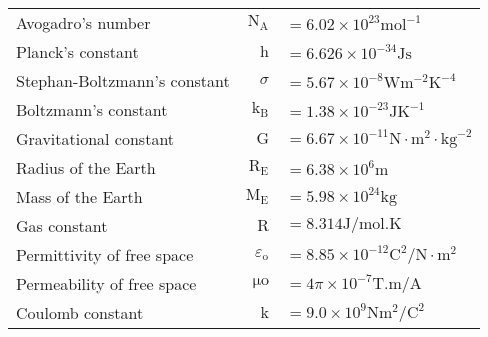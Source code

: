 \documentclass{extarticle}
\begin{document}
\markStart[50]
\begin{tabularx}{\textwidth}{@{}X@{}r@{}l@{}}
Avogadro's number & $\mathrm{N}_{\mathrm{A}}$ & $=6.02 \times 10^{23} \mathrm{mol}^{-1}$ \\
Planck's constant & $\mathrm{h}$ & $=6.626 \times 10^{-34} \mathrm{J} \mathrm{s}$ \\
Stephan-Boltzmann's constant & $\sigma$ & $=5.67 \times 10^{-8} \mathrm{W} \mathrm{m}^{-2} \mathrm{K}^{-4}$ \\
Boltzmann's constant & $\mathrm{k}_{\mathrm{B}}$ & $=1.38 \times 10^{-23} \mathrm{J} \mathrm{K}^{-1}$ \\



Gravitational constant & $\mathrm{G}$ & $=6.67 \times 10^{-11} \mathrm{N} \cdot \mathrm{m}^{2} \cdot \mathrm{kg}^{-2}$ \\
Radius of the Earth & $\mathrm{R}_{\mathrm{E}}$ & $=6.38 \times 10^{6} \mathrm{m}$ \\
Mass of the Earth & $\mathrm{M}_{\mathrm{E}}$ & $=5.98 \times 10^{24} \mathrm{kg}$ \\
Gas constant & $\mathrm{R}$ & $=8.314 \mathrm{J} / \mathrm{mol} . \mathrm{K}$ \\
Permittivity of free space & $\varepsilon_{\mathrm{o}}$ & $=8.85 \times 10^{-12} \mathrm{C}^{2} / \mathrm{N} \cdot \mathrm{m}^{2}$ \\
Permeability of free space & $\mathrm{\mu o}$ & $=4 \pi \times 10^{-7} \mathrm{T} . \mathrm{m} / \mathrm{A}$ \\
Coulomb constant & $\mathrm{k}$ & $=9.0 \times 10^{9} \mathrm{N} \mathrm{m}^{2} / \mathrm{C}^{2}$ \\

\end{tabularx}
\end{document}
